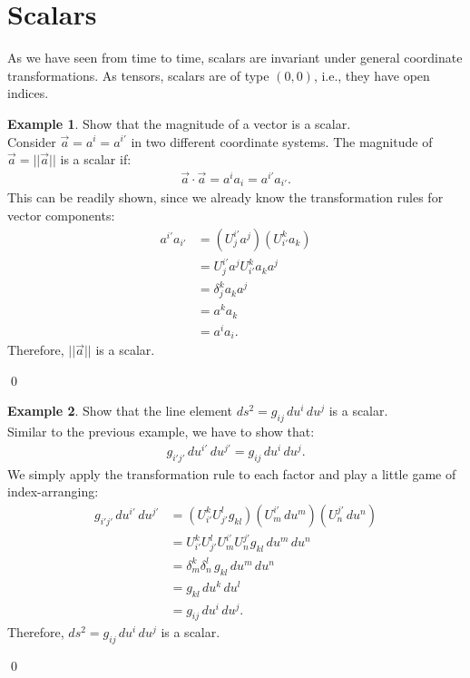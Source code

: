 \documentclass{book}
\theoremstyle{definition}
\newtheorem{exmp}{Example}[section]
\begin{document}
\section{Scalars}
As we have seen from time to time, scalars are invariant under general coordinate transformations. As tensors, scalars are of type $(0,0)$, i.e., they have open indices.
\begin{exmp}
	Show that the magnitude of a vector is a scalar.\\
	
	Consider $\vec{a} = {a^i} = {a^{i'}}$ in two different coordinate systems. The magnitude of $\vec{a} = \vert\vert \vec{a} \vert\vert$ is a scalar if:
	\begin{align*}
	\vec{a}\cdot\vec{a} = a^ia_i = a^{i'}a_{i'}.
	\end{align*} 
	This can be readily shown, since we already know the transformation rules for vector components:
	\begin{align*}
	a^{i'}a_{i'} &= \left( U^{i'}_j a^j \right) \left( U^{k}_{i'}a_k\right) \\
	&= U^{i'}_j a^j U^{k}_{i'} a_k a^j\\
	&= \delta^{k}_j a_k a^j\\
	&= a^k a_k\\
	&= a^i a_i.
	\end{align*}
	Therefore, $\vert\vert \vec{a} \vert\vert$ is a scalar.
\end{exmp}\qed
\begin{exmp}
	Show that the line element $ds^2 = g_{ij}\,du^i\,du^j$ is a scalar. \\
	
	Similar to the previous example, we have to show that:
	\begin{align*}
	g_{i'j'}\,du^{i'}\,du^{j'} = g_{ij}\,du^i\,du^j.
	\end{align*}
	We simply apply the transformation rule to each factor and play a little game of index-arranging:
	\begin{align*}
	g_{i'j'}\,du^{i'}\,du^{j'} &= \left( U^k_{i'} U^l_{j'} g_{kl}\right) \left(U^{i'}_m \,du^m \right) \left(U^{j'}_n \,du^n\right) \\
	&= U^k_{i'} U^l_{j'} U^{i'}_m U^{j'}_n g_{kl}\,du^m\,du^n\\
	&= \delta^k_m\delta^l_n \,g_{kl}\,du^m\,du^n\\
	&= g_{kl}\,du^k\,du^l\\
	&= g_{ij}\,du^i\,du^j.
	\end{align*}
	Therefore, $ds^2 = g_{ij}\,du^i\,du^j$ is a scalar.
\end{exmp}\qed
\end{document}
